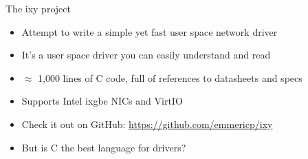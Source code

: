 \documentclass[NET,english,aspectratio=43,notitleframe]{tumbeamer}
\begin{document}
\begin{frame}{The ixy project}
\begin{itemize}
\item Attempt to write a simple yet fast user space network driver
\item It's a user space driver you can easily understand and read
\item $\approx$ 1,000 lines of C code, full of references to datasheets and specs
\item Supports Intel ixgbe NICs and VirtIO %
\item Check it out on GitHub: \url{https://github.com/emmericp/ixy}
\vspace{1ex}
\item But is C the best language for drivers?
\end{itemize}
\end{frame}
\end{document}
